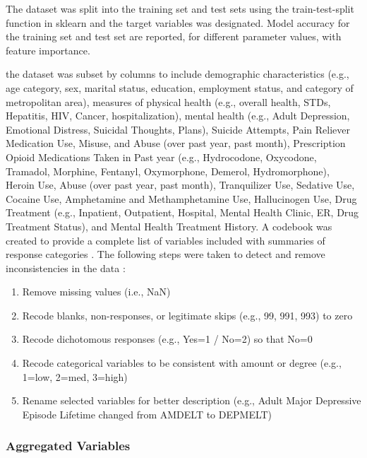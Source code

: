 \documentclass[sigconf]{acmart}
\begin{document}
The dataset was split into the training set and test 
sets using the train-test-split function in sklearn and the target variables 
was designated. Model accuracy for the training set and test set are reported, 
for different parameter values, with feature importance. 


the 
dataset was subset by columns to include demographic characteristics (e.g., 
age category, sex, marital status, education, employment status, and category 
of metropolitan area), measures of physical health (e.g., overall health, 
STDs, Hepatitis, HIV, Cancer, hospitalization), mental health (e.g., Adult 
Depression, Emotional Distress, Suicidal Thoughts, Plans), Suicide Attempts, 
Pain Reliever Medication Use, Misuse, and Abuse (over past year, past month), 
Prescription Opioid Medications Taken in Past year (e.g., Hydrocodone, 
Oxycodone, Tramadol, Morphine, Fentanyl, Oxymorphone, Demerol, Hydromorphone), 
Heroin Use, Abuse (over past year, past month), Tranquilizer Use, Sedative Use, 
Cocaine Use, Amphetamine and Methamphetamine Use, Hallucinogen Use, Drug 
Treatment (e.g., Inpatient, Outpatient, Hospital, Mental Health Clinic, ER, 
Drug Treatment Status), and Mental Health Treatment History. A codebook was 
created to provide a complete list of variables included with summaries 
of response categories \cite{codebook17}. The following steps were taken 
to detect and remove inconsistencies in the data \cite{rahm00}:
\begin{enumerate}
  \item Remove missing values (i.e., NaN) 
  \item Recode blanks, non-responses, or legitimate skips (e.g., 99, 991, 
  993) to zero  
  \item Recode dichotomous responses (e.g., Yes=1 / No=2) so that No=0
  \item Recode categorical variables to be consistent with amount or degree 
  (e.g., 1=low, 2=med, 3=high)
   \item Rename selected variables for better description (e.g., 
   Adult Major Depressive Episode Lifetime changed from AMDELT to DEPMELT)
\end{enumerate}

\subsubsection{Aggregated Variables}
\end{document}
